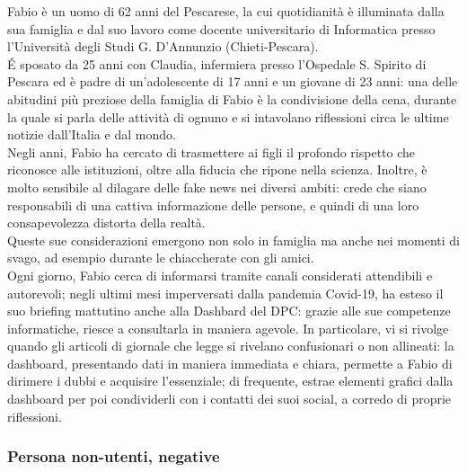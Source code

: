 Fabio è un uomo di 62 anni del Pescarese, la cui quotidianità è illuminata dalla sua famiglia e dal suo lavoro come docente universitario di Informatica presso l'Università degli Studi G. D'Annunzio (Chieti-Pescara).\\ 
É sposato da 25 anni con Claudia, infermiera presso l'Ospedale S. Spirito di Pescara ed è padre di un'adolescente di 17 anni e un giovane di 23 anni: una delle abitudini più preziose della famiglia di Fabio è la condivisione della cena, durante la quale si parla delle attività di ognuno e si intavolano riflessioni circa le ultime notizie dall'Italia e dal mondo.\\
Negli anni, Fabio ha cercato di trasmettere ai figli il profondo rispetto che riconosce alle istituzioni, oltre alla fiducia che ripone nella scienza. Inoltre, è molto sensibile al dilagare delle fake news nei diversi ambiti: crede che siano responsabili di una cattiva informazione delle persone, e quindi di una loro consapevolezza distorta della realtà.\\ 
Queste sue considerazioni emergono non solo in famiglia ma anche nei momenti di svago, ad esempio durante le chiaccherate con gli amici.\\ 
Ogni giorno, Fabio cerca di informarsi tramite canali considerati attendibili e autorevoli; negli ultimi mesi imperversati dalla pandemia Covid-19, ha esteso il suo briefing mattutino anche alla Dashbard del DPC: grazie alle sue competenze informatiche, riesce a consultarla in maniera agevole. In particolare, vi si rivolge quando gli articoli di giornale che legge si rivelano confusionari o non allineati: la dashboard, presentando dati in maniera immediata e chiara, permette a Fabio di dirimere i dubbi e acquisire l'essenziale; di frequente, estrae elementi grafici dalla dashboard per poi condividerli con i contatti dei suoi social, a corredo di proprie riflessioni.

\subsubsection{Persona non-utenti, negative}
